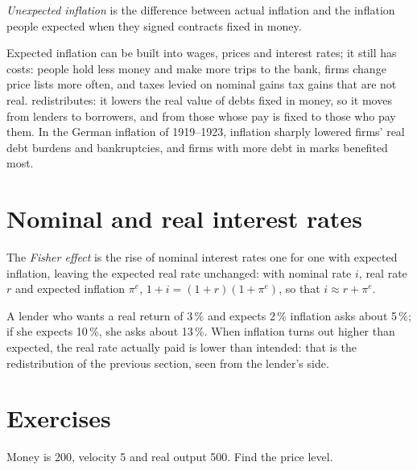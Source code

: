 \begin{definition}\label{def:g12:inflation-and-money:unexpected-inflation}
\emph{Unexpected inflation} is the difference between actual inflation and the inflation people expected when they signed contracts fixed in
money.
\end{definition}

Expected inflation can be built into wages, prices and interest rates; it still has costs: people hold less money and make more trips to the bank, firms change price lists
more often, and taxes levied on nominal gains tax gains that are not real.  redistributes: it lowers the real value of debts fixed in money, so it moves
 from lenders to borrowers, and from those whose pay is fixed to those who pay them. In the German inflation of 1919--1923, inflation sharply lowered firms' real
debt burdens and bankruptcies, and firms with more debt in marks benefited most.

\section{Nominal and real interest rates}\label{sec:g12:inflation-and-money:fisher}

\begin{definition}\label{def:g12:inflation-and-money:fisher-effect}
The \emph{Fisher effect} is the rise of nominal interest rates one for one with expected inflation, leaving the expected real rate unchanged: with
nominal rate $i$, real rate $r$ and expected inflation $\pi^e$, $1 + i = (1 + r)(1 + \pi^e)$, so that $i \approx r + \pi^e$.
\end{definition}

A lender who wants a real return of 3\,\% and expects 2\,\% inflation asks about 5\,\%; if she expects 10\,\%, she asks about 13\,\%. When inflation turns out higher than
expected, the real rate actually paid is lower than intended: that is the redistribution of the previous section, seen from the lender's side.

\section{Exercises}

\begin{exercise}[$\star$]\label{exo:g12:inflation-and-money:1}
Money is 200, velocity 5 and real output 500. Find the price level.
\end{exercise}

